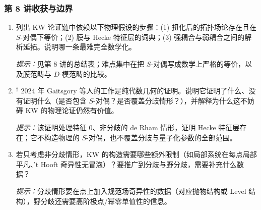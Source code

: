 \subsubsection*{第 8 讲\quad 收获与边界}

\begin{enumerate}[label=\arabic*.,start=28,leftmargin=2.4em,itemsep=6pt]
\item 列出 KW 论证链中依赖以下物理假设的步骤：(1) 扭化后的拓扑场论存在且在 $S$-对偶下等价；(2) 膜与 Hecke 特征层的词典；(3) 强耦合与弱耦合之间的解析延拓。说明哪一条最难完全数学化。
\par\smallskip\noindent\emph{提示：}见第 8 讲的总结表；难点集中在把 $S$-对偶写成数学上严格的等价，以及膜范畴与 $D$-模范畴的比较。

\item$^\dagger$ 2024 年 Gaitsgory 等人的工作是纯代数几何的证明。说明它证明了什么、没有证明什么（是否包含 $S$-对偶？是否覆盖分歧情形？），并解释为什么这不妨碍 KW 的物理论证仍然有价值。
\par\smallskip\noindent\emph{提示：}该证明处理特征 $0$、非分歧的 de Rham 情形，证明 Hecke 特征层存在；它不构造物理的 $S$-对偶，也不覆盖分歧与量子化参数的全部范围。

\item 若只考虑非分歧情形，KW 的构造需要哪些额外限制（如局部系统在每点局部平凡、't Hooft 奇异性无冒泡）？要推广到分歧与野分歧，需要补充什么数据？
\par\smallskip\noindent\emph{提示：}分歧情形要在点上加入规范场奇异性的数据（对应抛物结构或 Level 结构），野分歧还需要高阶极点/幂零单值性的信息。
\end{enumerate}
